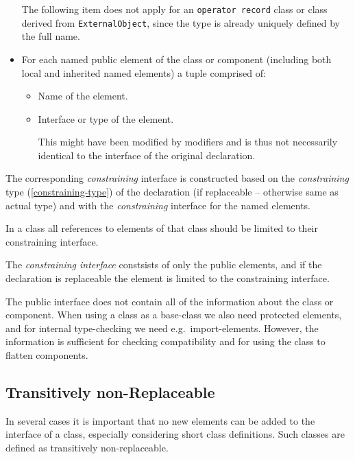 \begin{itemize}
  The following item does not apply for an \lstinline!operator record! class or class derived from \lstinline!ExternalObject!, since the type is already
  uniquely defined by the full name.
\item
  For each named public element of the class or component (including
  both local and inherited named elements) a tuple comprised of:
  \begin{itemize}
  \item
    Name of the element.
  \item
    Interface or type of the element.
    \begin{nonnormative}
    This might have been modified by modifiers and is thus not necessarily identical to the interface of the original declaration.
    \end{nonnormative}
  \end{itemize}
\end{itemize}

The corresponding \emph{constraining} interface is constructed based on the \emph{constraining} type (\cref{constraining-type}) of the declaration (if replaceable -- otherwise same as actual
type) and with the \emph{constraining} interface for the named elements.

In a class all references to elements of that class should be limited to their constraining interface.

\begin{nonnormative}
The \emph{constraining interface} constsists of only the public elements, and if the declaration is replaceable the element is limited to the constraining interface.
\end{nonnormative}

\begin{nonnormative}
The public interface does not contain all of the information about the class or component.  When using a class as a base-class we also need protected elements, and
for internal type-checking we need e.g.\ import-elements.  However, the information is sufficient for checking compatibility and for using the class to flatten components.
\end{nonnormative}

\subsection{Transitively non-Replaceable}\label{transitively-non-replaceable}

\begin{nonnormative}
In several cases it is important that no new elements can be
added to the interface of a class, especially considering short class
definitions. Such classes are defined as transitively
non-replaceable.
\end{nonnormative}

